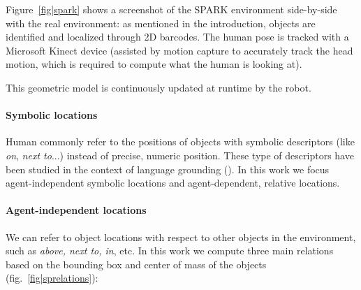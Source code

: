 Figure~\ref{fig|spark} shows a screenshot of the SPARK environment side-by-side
with the real environment: as mentioned in the introduction, objects are
identified and localized through 2D barcodes. The human pose is tracked with
a Microsoft Kinect device (assisted by motion capture to accurately track the
head motion, which is required to compute what the human is looking at).

This geometric model is continuously updated at runtime by the robot.

\paragraph{Symbolic locations}

Human commonly refer to the positions of objects with symbolic descriptors
(like \emph{on}, \emph{next to}...) instead of precise, numeric position. These
type of descriptors have been studied in the context of language grounding
(\cite{O'Keefe1999,Matuszek2010,Regier2001,Kelleher2006,Blisard2005}). In this
work we focus agent-independent symbolic locations and agent-dependent,
relative locations.

\paragraph{Agent-independent locations}

We can refer to object locations with respect to other objects in the
environment, such as \emph{above, next to, in}, etc. In this work we compute
three main relations based on the bounding box and center of mass of the
objects (fig.~\ref{fig|sprelations}): 

